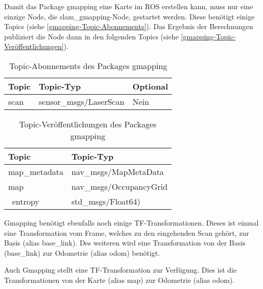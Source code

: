 Damit das Package gmapping eine Karte im \ac{ROS} erstellen kann, muss nur eine einzige Node, die slam\_gmapping-Node, gestartet werden. Diese benötigt einige Topics (siehe \autoref{gmapping-Topic-Abonnements}). Das Ergebnis der Berechnungen publiziert die Node dann in den folgenden Topics (siehe \autoref{gmapping-Topic-Veröffentlichungen}).

\begin{table}[t]
  \caption{Topic-Abonnements des Packages gmapping}
  \label{gmapping-Topic-Abonnements}
  \centering
  \sffamily
  \begin{footnotesize}
    \begin{tabular}{l l l}
    \toprule
    \textbf{Topic} & \textbf{Topic-Typ} & \textbf{Optional}\\
    \midrule
    scan	& sensor\_msgs/LaserScan & Nein\\
    \bottomrule
    \end{tabular}
  \end{footnotesize}
  \rmfamily
\end{table}

\begin{table}[t]
  \caption{Topic-Veröffentlichungen des Packages gmapping}
  \label{gmapping-Topic-Veröffentlichungen}
  \centering
  \sffamily
  \begin{footnotesize}
    \begin{tabular}{l l}
    \toprule
    \textbf{Topic} & \textbf{Topic-Typ}\\
    \midrule
    map\_metadata & nav\_msgs/MapMetaData\\
    map & nav\_msgs/OccupancyGrid\\
    ~entropy & std\_msgs/Float64)\\
    \bottomrule
    \end{tabular}
  \end{footnotesize}
  \rmfamily
\end{table}

Gmapping benötigt ebenfalls noch einige TF-Transformationen. Dieses ist einmal eine Transformation vom Frame, welches zu den eingehenden Scan gehört, zur Basis (alias base\_link). Des weiteren wird eine Transformation von der Basis (base\_link) zur Odometrie (alias odom) benötigt.

Auch Gmapping stellt eine TF-Transformation zur Verfügung. Dies ist die Transformationen von der Karte (alias map) zur Odometrie (alias odom). \autocite{gmappingRosWiki}